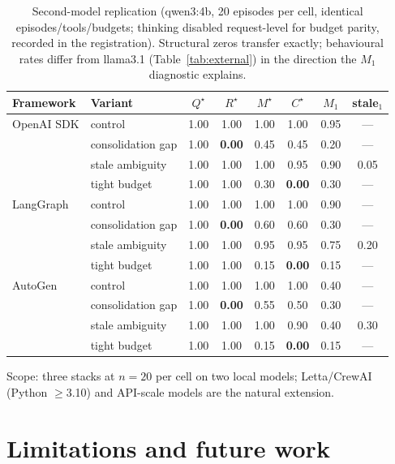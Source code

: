 \documentclass{article}
\begin{document}
\begin{table}[h]
\caption{Second-model replication (qwen3:4b, 20 episodes per cell,
identical episodes/tools/budgets; thinking disabled request-level for
budget parity, recorded in the registration). Structural zeros
transfer exactly; behavioural rates differ from llama3.1
(Table~\ref{tab:external}) in the direction the $M_1$ diagnostic
explains.}
\label{tab:external-qwen}
\centering
\small
\begin{tabular}{llcccccc}
\toprule
Framework & Variant & $Q^\star$ & $R^\star$ & $M^\star$ & $C^\star$ & $M_1$ & stale$_1$ \\
\midrule
OpenAI SDK & control     & 1.00 & 1.00 & 1.00 & 1.00 & 0.95 & --- \\
           & consolidation gap & 1.00 & \textbf{0.00} & 0.45 & 0.45 & 0.20 & --- \\
           & stale ambiguity   & 1.00 & 1.00 & 1.00 & 0.95 & 0.90 & 0.05 \\
           & tight budget      & 1.00 & 1.00 & 0.30 & \textbf{0.00} & 0.30 & --- \\
\midrule
LangGraph  & control     & 1.00 & 1.00 & 1.00 & 1.00 & 0.90 & --- \\
           & consolidation gap & 1.00 & \textbf{0.00} & 0.60 & 0.60 & 0.30 & --- \\
           & stale ambiguity   & 1.00 & 1.00 & 0.95 & 0.95 & 0.75 & 0.20 \\
           & tight budget      & 1.00 & 1.00 & 0.15 & \textbf{0.00} & 0.15 & --- \\
\midrule
AutoGen    & control     & 1.00 & 1.00 & 1.00 & 1.00 & 0.40 & --- \\
           & consolidation gap & 1.00 & \textbf{0.00} & 0.55 & 0.50 & 0.30 & --- \\
           & stale ambiguity   & 1.00 & 1.00 & 1.00 & 0.90 & 0.40 & 0.30 \\
           & tight budget      & 1.00 & 1.00 & 0.15 & \textbf{0.00} & 0.15 & --- \\
\bottomrule
\end{tabular}
\end{table}

Scope: three stacks at $n{=}20$ per cell on two local models;
Letta/CrewAI (Python $\ge$3.10) and API-scale models are the natural
extension.

\section{Limitations and future work}
\label{sec:limitations}
\end{document}
